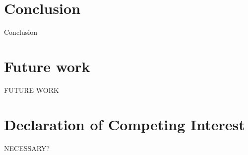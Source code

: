 \section{Conclusion} \label{Conclusion}
Conclusion
\section{Future work}
FUTURE WORK

\section{Declaration of Competing Interest}

NECESSARY?
